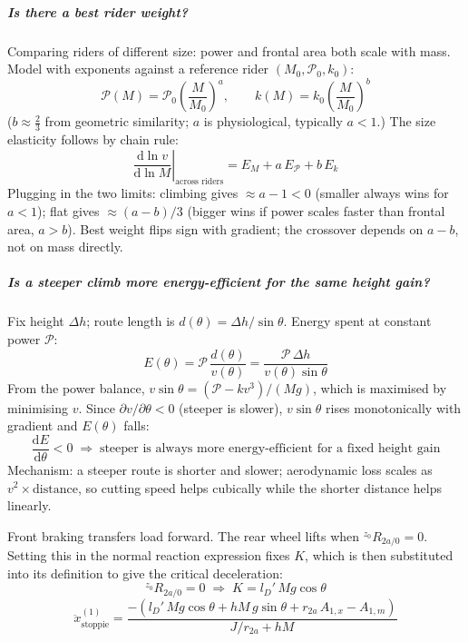 \begin{aiblock}
\subparagraph{Is there a best rider weight?}
Comparing riders of different size: power and frontal area both scale with mass. Model with
exponents against a reference rider $(M_0, \mathcal{P}_0, k_0)$:
\begin{equation}
    \mathcal{P}(M) = \mathcal{P}_0\!\left(\frac{M}{M_0}\right)^{a}, \qquad
    k(M) = k_0\!\left(\frac{M}{M_0}\right)^{b}
\end{equation}
($b \approx \tfrac{2}{3}$ from geometric similarity; $a$ is physiological, typically $a < 1$.)
The size elasticity follows by chain rule:
\begin{equation}
    \boxed{\left.\frac{\mathrm{d}\ln v}{\mathrm{d}\ln M}\right|_{\text{across riders}}
    = E_M + a\,E_{\mathcal{P}} + b\,E_k}
\end{equation}
Plugging in the two limits: climbing gives $\approx a - 1 < 0$ (smaller always wins for $a < 1$);
flat gives $\approx (a-b)/3$ (bigger wins if power scales faster than frontal area, $a > b$).
Best weight flips sign with gradient; the crossover depends on $a - b$, not on mass directly.

\subparagraph{Is a steeper climb more energy-efficient for the same height gain?}
Fix height $\Delta h$; route length is $d(\theta) = \Delta h / \sin\theta$. Energy spent at
constant power $\mathcal{P}$:
\begin{equation}
    E(\theta) = \mathcal{P}\,\frac{d(\theta)}{v(\theta)}
    = \frac{\mathcal{P}\,\Delta h}{v(\theta)\sin\theta}
\end{equation}
From the power balance, $v\sin\theta = (\mathcal{P} - kv^3)/(Mg)$, which is maximised by
minimising $v$. Since $\partial v/\partial\theta < 0$ (steeper is slower),
$v\sin\theta$ rises monotonically with gradient and $E(\theta)$ falls:
\begin{equation}
    \frac{\mathrm{d}E}{\mathrm{d}\theta} < 0
    \;\Longrightarrow\;
    \text{steeper is always more energy-efficient for a fixed height gain}
\end{equation}
Mechanism: a steeper route is shorter and slower; aerodynamic loss scales as $v^2 \times
\text{distance}$, so cutting speed helps cubically while the shorter distance helps linearly.

Front braking transfers load forward. The rear wheel lifts when ${}^{z_0}R_{2a/0} = 0$. Setting this in the normal reaction expression fixes $K$, which is then substituted into its definition to give the critical deceleration:
\begin{equation}
    {}^{z_0}R_{2a/0} = 0 \;\Rightarrow\; K = l_D'\,Mg\cos\theta
\end{equation}
\begin{equation}
    \ddot{x}^{(1)}_{\text{stoppie}} = \frac{-\left(l_D'\,Mg\cos\theta + hM\,g\sin\theta + r_{2a}\,A_{1,x} - A_{1,m}\right)}{J/r_{2a} + hM}
\end{equation}


\end{aiblock}
